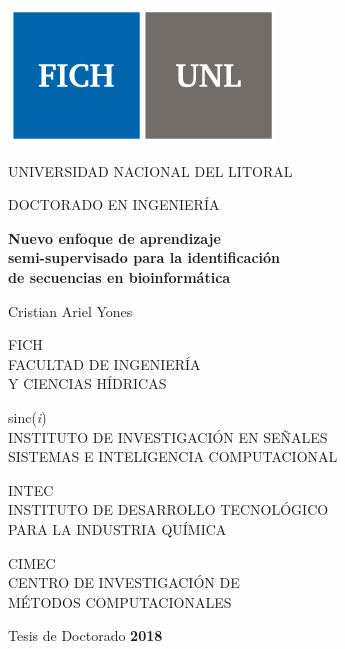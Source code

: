 \thispagestyle{empty}

\begin{flushright}
	\includegraphics[scale=0.4]{fig/logo_unl.png}
\end{flushright}
\vskip-2.5cm %
\textrm{ UNIVERSIDAD NACIONAL DEL LITORAL}

\vspace{2cm}

\begin{center}
	\noindent \textrm{\large DOCTORADO EN INGENIERÍA}
\end{center}

\vspace{2.5cm}


\noindent\textrm{\bf \huge Nuevo enfoque de aprendizaje}\\[0.2 cm]
\noindent\textrm{\bf \huge semi-supervisado para la identificación} \\[0.2 cm]
\noindent\textrm{\bf \huge de secuencias en bioinformática}

\vspace{1.5cm}

\noindent \textrm{{\LARGE Cristian Ariel Yones}}

\vspace{3cm}


\noindent \textrm{FICH} \\
\noindent \textrm{\small FACULTAD DE INGENIERÍA}\\
\noindent \textrm{\small Y CIENCIAS HÍDRICAS}
\vspace{0.5cm}

\noindent \textrm{sinc(\textit{i})}\\
\noindent \textrm{\small INSTITUTO DE INVESTIGACIÓN EN SEÑALES}\\
\noindent \textrm{\small SISTEMAS E INTELIGENCIA COMPUTACIONAL}
\vspace{0.5 cm}

\noindent \textrm{INTEC}\\
\noindent \textrm{\small INSTITUTO DE DESARROLLO TECNOLÓGICO}\\
\noindent \textrm{\small PARA LA INDUSTRIA QUÍMICA}
\vspace{0.5 cm}

\noindent \textrm{CIMEC}\\
\noindent \textrm{\small CENTRO DE INVESTIGACIÓN DE}\\
\noindent \textrm{\small MÉTODOS COMPUTACIONALES}


\vspace{1cm}

\begin{flushright}
	\noindent \large{Tesis de Doctorado \textbf{2018}}
\end{flushright}

